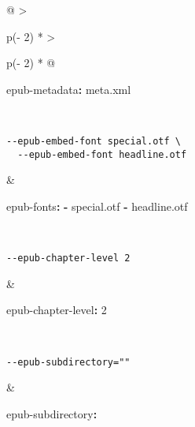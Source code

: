 \documentclass[
]{article}
\newenvironment{Shaded}{}{}
\newcommand{\AttributeTok}[1]{\textcolor[rgb]{0.49,0.56,0.16}{#1}}
\newcommand{\DecValTok}[1]{\textcolor[rgb]{0.25,0.63,0.44}{#1}}
\newcommand{\FunctionTok}[1]{\textcolor[rgb]{0.02,0.16,0.49}{#1}}
\newcommand{\KeywordTok}[1]{\textcolor[rgb]{0.00,0.44,0.13}{\textbf{#1}}}
\newcommand{\StringTok}[1]{\textcolor[rgb]{0.25,0.44,0.63}{#1}}
\begin{document}
\begin{longtable}[]{@{}
  >{\raggedright\arraybackslash}p{(\columnwidth - 2\tabcolsep) * }
  >{\raggedright\arraybackslash}p{(\columnwidth - 2\tabcolsep) * }@{}}
\begin{minipage}[t]{\linewidth}
\begin{Shaded}
\begin{Highlighting}[]
\FunctionTok{epub{-}metadata}\KeywordTok{:}\AttributeTok{ meta.xml}
\end{Highlighting}
\end{Shaded}
\end{minipage} \\
\begin{minipage}[t]{\linewidth}\raggedright
\begin{verbatim}
--epub-embed-font special.otf \
  --epub-embed-font headline.otf
\end{verbatim}
\end{minipage} & \begin{minipage}[t]{\linewidth}\raggedright
\begin{Shaded}
\begin{Highlighting}[]
\FunctionTok{epub{-}fonts}\KeywordTok{:}
\AttributeTok{  }\KeywordTok{{-}}\AttributeTok{ special.otf}
\AttributeTok{  }\KeywordTok{{-}}\AttributeTok{ headline.otf}
\end{Highlighting}
\end{Shaded}
\end{minipage} \\
\begin{minipage}[t]{\linewidth}\raggedright
\begin{verbatim}
--epub-chapter-level 2
\end{verbatim}
\end{minipage} & \begin{minipage}[t]{\linewidth}\raggedright
\begin{Shaded}
\begin{Highlighting}[]
\FunctionTok{epub{-}chapter{-}level}\KeywordTok{:}\AttributeTok{ }\DecValTok{2}
\end{Highlighting}
\end{Shaded}
\end{minipage} \\
\begin{minipage}[t]{\linewidth}\raggedright
\begin{verbatim}
--epub-subdirectory=""
\end{verbatim}
\end{minipage} & \begin{minipage}[t]{\linewidth}\raggedright
\begin{Shaded}
\begin{Highlighting}[]
\FunctionTok{epub{-}subdirectory}\KeywordTok{:}\AttributeTok{ }\StringTok{\textquotesingle{}\textquotesingle{}}

\end{Highlighting}
\end{Shaded}
\end{minipage}
\end{longtable}
\end{document}
